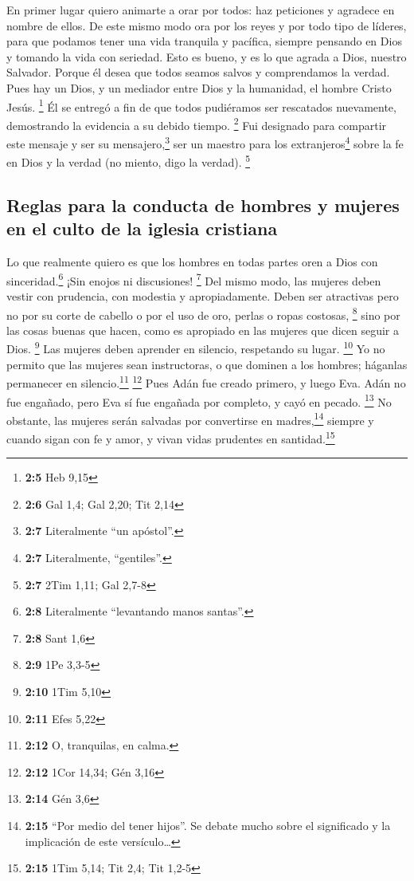  En primer lugar quiero animarte a orar por todos: haz
peticiones y agradece en nombre de ellos.  De este mismo
modo ora por los reyes y por todo tipo de líderes, para que podamos
tener una vida tranquila y pacífica, siempre pensando en Dios y tomando
la vida con seriedad.  Esto es bueno, y es lo que agrada a
Dios, nuestro Salvador.  Porque él desea que todos seamos
salvos y comprendamos la verdad.  Pues hay un Dios, y un
mediador entre Dios y la humanidad, el hombre Cristo Jesús. \footnote{\textbf{2:5}
  Heb 9,15}  Él se entregó a fin de que todos pudiéramos
ser rescatados nuevamente, demostrando la evidencia a su debido tiempo.
\footnote{\textbf{2:6} Gal 1,4; Gal 2,20; Tit 2,14}  Fui
designado para compartir este mensaje y ser su mensajero,\footnote{\textbf{2:7}
  Literalmente ``un apóstol''.} ser un maestro para los
extranjeros\footnote{\textbf{2:7} Literalmente, ``gentiles''.} sobre la
fe en Dios y la verdad (no miento, digo la verdad). \footnote{\textbf{2:7}
  2Tim 1,11; Gal 2,7-8}

\hypertarget{reglas-para-la-conducta-de-hombres-y-mujeres-en-el-culto-de-la-iglesia-cristiana}{%
\subsection{Reglas para la conducta de hombres y mujeres en el culto de
la iglesia
cristiana}\label{reglas-para-la-conducta-de-hombres-y-mujeres-en-el-culto-de-la-iglesia-cristiana}}

 Lo que realmente quiero es que los hombres en todas
partes oren a Dios con sinceridad.\footnote{\textbf{2:8} Literalmente
  ``levantando manos santas''.} ¡Sin enojos ni discusiones! \footnote{\textbf{2:8}
  Sant 1,6}  Del mismo modo, las mujeres deben vestir con
prudencia, con modestia y apropiadamente. Deben ser atractivas pero no
por su corte de cabello o por el uso de oro, perlas o ropas costosas,
\footnote{\textbf{2:9} 1Pe 3,3-5}  sino por las cosas
buenas que hacen, como es apropiado en las mujeres que dicen seguir a
Dios. \footnote{\textbf{2:10} 1Tim 5,10}  Las mujeres
deben aprender en silencio, respetando su lugar. \footnote{\textbf{2:11}
  Efes 5,22}  Yo no permito que las mujeres sean
instructoras, o que dominen a los hombres; háganlas permanecer en
silencio.\footnote{\textbf{2:12} O, tranquilas, en calma.} \footnote{\textbf{2:12}
  1Cor 14,34; Gén 3,16}  Pues Adán fue creado primero, y
luego Eva.  Adán no fue engañado, pero Eva sí fue
engañada por completo, y cayó en pecado. \footnote{\textbf{2:14} Gén 3,6}
 No obstante, las mujeres serán salvadas por convertirse
en madres,\footnote{\textbf{2:15} ``Por medio del tener hijos''. Se
  debate mucho sobre el significado y la implicación de este
  versículo\ldots{}} siempre y cuando sigan con fe y amor, y vivan vidas
prudentes en santidad.\footnote{\textbf{2:15} 1Tim 5,14; Tit 2,4; Tit
  1,2-5}

